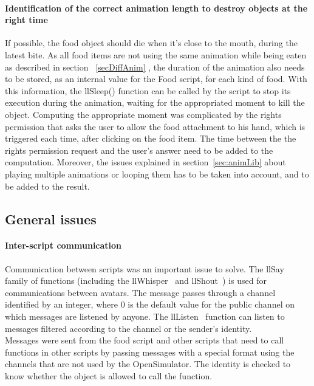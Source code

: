 \begin{itemize}
\begin{itemize}
{	\paragraph{Identification of the correct animation length to destroy objects at the right time}
\label{sec:animBite}
If possible, the food object should die when it's close to the mouth, during the latest bite. As all food items are not using the same animation while being eaten as described in section ~\ref{secDiffAnim} , the duration of the animation also needs to be stored, as an internal value for the Food script, for each kind of food. With this information, the llSleep() function can be called by the script to stop its execution during the animation, waiting for the appropriated moment to kill the object. 
Computing the appropriate moment was complicated by the rights permission that asks the user to allow the food attachment to his hand, which is triggered each time, after clicking on the food item. The time between the the rights permission request and the user's answer need to be added to the computation. Moreover, the issues explained in section~\ref{sec:animLib} about playing multiple animations or looping them has to be taken into account, and to be added to the result.\\


\subsection{General issues}



\paragraph{Inter-script communication} 
\label{llsayCom}
Communication between scripts was an important issue to solve. 
The llSay ~\cite{URLsay} family of functions (including the llWhisper~\cite{URLwh} and llShout~\cite{URLShout}) is used for communications between avatars. The message passes through a channel identified by an integer, where 0 is the default value for the public channel on which messages are listened by anyone. The llListen~\cite{URLsay} function can listen to messages filtered according to the channel or the sender's identity. 
\\Messages were sent from the food script and other scripts that need to call functions in other scripts by passing messages with a special format using the channels that are not used by the OpenSimulator. The identity is checked to know whether the object is allowed to call the function.

}
\end{itemize}
\end{itemize}
